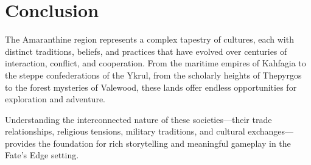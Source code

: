 \section{Conclusion}

The Amaranthine region represents a complex tapestry of cultures, each with distinct traditions, beliefs, and practices that have evolved over centuries of interaction, conflict, and cooperation. From the maritime empires of Kahfagia to the steppe confederations of the Ykrul, from the scholarly heights of Thepyrgos to the forest mysteries of Valewood, these lands offer endless opportunities for exploration and adventure.

Understanding the interconnected nature of these societies---their trade relationships, religious tensions, military traditions, and cultural exchanges---provides the foundation for rich storytelling and meaningful gameplay in the Fate's Edge setting.
